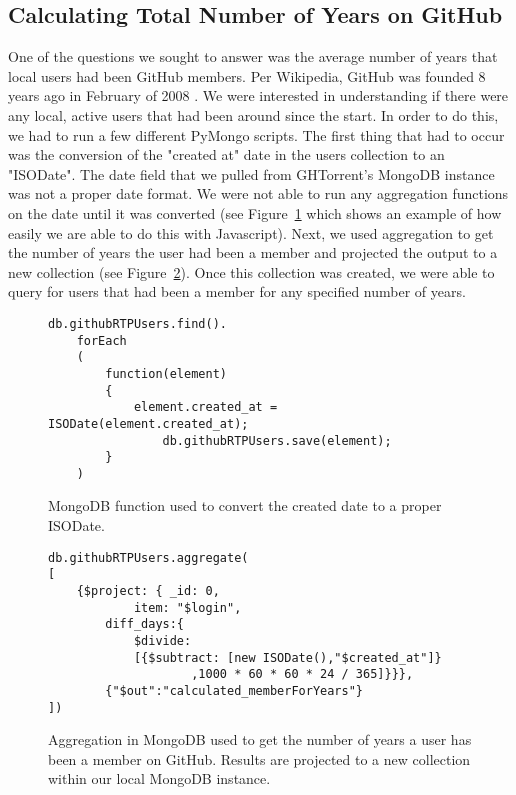 \subsection{Calculating Total Number of Years on GitHub}
One of the questions we sought to answer was the average number of years that local users had been GitHub members. Per Wikipedia, GitHub was founded 8 years ago in February of 2008 \cite{_github_????}. We were interested in understanding if there were any local, active users that had been around since the start. In order to do this, we had to run a few different PyMongo scripts. The first thing that had to occur was the conversion of the "created at" date in the users collection to an "ISODate". The date field that we pulled from GHTorrent's MongoDB instance was not a proper date format. We were not able to run any aggregation functions on the date until it was converted (see Figure~\ref{fig:convert-to-isodate} which shows an example of how easily we are able to do this with Javascript). Next, we used aggregation to get the number of years the user had been a member and projected the output to a new collection (see Figure~\ref{fig:membership-years}). Once this collection was created, we were able to query for users that had been a member for any specified number of years.

\begin{figure}
\begin{lstlisting}
db.githubRTPUsers.find().
	forEach
    (
    	function(element)
        {
        	element.created_at = ISODate(element.created_at);
            	db.githubRTPUsers.save(element);
        }
    )
\end{lstlisting}
\caption{MongoDB function used to convert the created date to a proper ISODate.}
\label{fig:convert-to-isodate}
\end{figure}

\begin{figure}
\begin{lstlisting}
db.githubRTPUsers.aggregate(
[
	{$project: { _id: 0,
    		item: "$login",
   		diff_days:{
        	$divide:
            [{$subtract: [new ISODate(),"$created_at"]}
                	,1000 * 60 * 60 * 24 / 365]}}},
    	{"$out":"calculated_memberForYears"}
])
\end{lstlisting}
\caption{Aggregation in MongoDB used to get the number of years a user has been a member on GitHub. Results are projected to a new collection within our local MongoDB instance.}
\label{fig:membership-years}
\end{figure}

